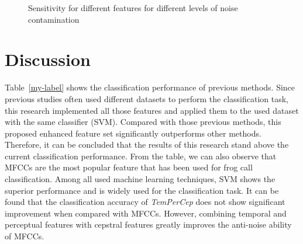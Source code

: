 \begin{figure}[htb!] %
\caption{Sensitivity for different features for different levels of noise contamination}
\label{diffNoise} 
\end{figure}


\section{Discussion}
Table~\ref{my-label} shows the classification performance of previous methods. Since previous studies often used different datasets to perform the classification task, this research implemented all those features and applied them to the used dataset with the same classifier (SVM). Compared with those previous methods, this proposed enhanced feature set significantly outperforms other methods. Therefore, it can be concluded that the results of this research stand above the current classification performance. From the table, we can also observe that MFCCs are the most popular feature that has been used for frog call classification. Among all used machine learning techniques, SVM shows the superior performance and is widely used for the classification task. It can be found that the classification accuracy of \textit{TemPerCep} does not show significant improvement when compared with MFCCs. However, combining temporal and perceptual features with cepstral features greatly improves the anti-noise ability of MFCCs.

